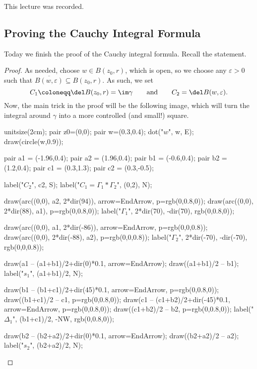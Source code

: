 \documentclass[../notes.tex]{subfiles}
\begin{document}

This lecture was recorded.

\subsection{Proving the Cauchy Integral Formula}
Today we finish the proof of the Cauchy integral formula. Recall the statement.
\thmcif*
\begin{proof}
	As needed, choose $w\in B(z_0,r)$, which is open, so we choose any $\varepsilon>0$ such that $\overline{B(w,\varepsilon)}\subseteq B(z_0,r)$. As such, we set
	\[C_1\coloneqq \del B(z_0,r)=\im\gamma\qquad\text{and}\qquad C_2=\del B(w,\varepsilon).\]
	Now, the main trick in the proof will be the following image, which will turn the integral around $\gamma$ into a more controlled (and small!) square.
	\begin{center}
		\begin{asy}
			unitsize(2cm);
			pair z0=(0,0);
			pair w=(0.3,0.4);
			dot("$w$", w, E);
			draw(circle(w,0.9));
			
			pair a1 = (-1.96,0.4);
			pair a2 = (1.96,0.4);
			pair b1 = (-0.6,0.4);
			pair b2 = (1.2,0.4);
			pair c1 = (0.3,1.3);
			pair c2 = (0.3,-0.5);
			
			label("$C_2$", c2, S);
			label("$C_1=\Gamma_1*\Gamma_2$", (0,2), N);
			
			draw(arc((0,0), a2, 2*dir(94)), arrow=EndArrow, p=rgb(0,0.8,0));
			draw(arc((0,0), 2*dir(88), a1), p=rgb(0,0.8,0));
			label("$\Gamma_1$", 2*dir(70), -dir(70), rgb(0,0.8,0));
			
			draw(arc((0,0), a1, 2*dir(-86)), arrow=EndArrow, p=rgb(0,0,0.8));
			draw(arc((0,0), 2*dir(-88), a2), p=rgb(0,0,0.8));
			label("$\Gamma_2$", 2*dir(-70), -dir(-70), rgb(0,0,0.8));
			
			draw(a1 -- (a1+b1)/2+dir(0)*0.1, arrow=EndArrow);
			draw((a1+b1)/2 -- b1);
			label("$s_1$", (a1+b1)/2, N);
			
			draw(b1 -- (b1+c1)/2+dir(45)*0.1, arrow=EndArrow, p=rgb(0,0.8,0));
			draw((b1+c1)/2 -- c1, p=rgb(0,0.8,0));
			draw(c1 -- (c1+b2)/2+dir(-45)*0.1, arrow=EndArrow, p=rgb(0,0.8,0));
			draw((c1+b2)/2 -- b2, p=rgb(0,0.8,0));
			label("$\Delta_1$", (b1+c1)/2, -NW, rgb(0,0.8,0));
			
			draw(b2 -- (b2+a2)/2+dir(0)*0.1, arrow=EndArrow);
			draw((b2+a2)/2 -- a2);
			label("$s_2$", (b2+a2)/2, N);
			

\end{asy}
\end{center}
\end{proof}
\end{document}
